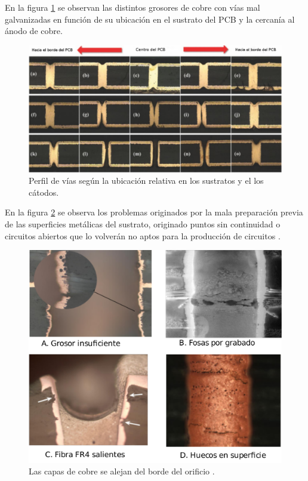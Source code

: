 En la figura  \ref{fig:thr_incorrecto_perfil} se observan las distintos grosores de cobre con vías mal galvanizadas en función de su ubicación en el sustrato del PCB y la cercanía al ánodo de cobre.

\begin{figure}[h]
	\centering
	\includegraphics[width=.9\textwidth]{Figures/Cap_2/through_hole_perfil_fallado}
	\caption{Perfil de vías según la ubicación relativa en los sustratos y el los cátodos.}
	\label{fig:thr_incorrecto_perfil}
\end{figure}

En la figura \ref{fig:fallas_en_PTH} se observa los problemas originados por la mala preparación previa de las superficies metálicas del sustrato, originado puntos sin continuidad o circuitos abiertos que lo volverán no aptos para la producción de circuitos \citep{euro_pth}.

\begin{figure}[h]
	\centering
	\includegraphics[width=.8\textwidth]{Figures/Cap_2/fallas_en_PTH}
	\caption{ Las capas de cobre se alejan del borde del orificio \citep{fatiga_termica}.}
	\label{fig:fallas_en_PTH}
\end{figure}

